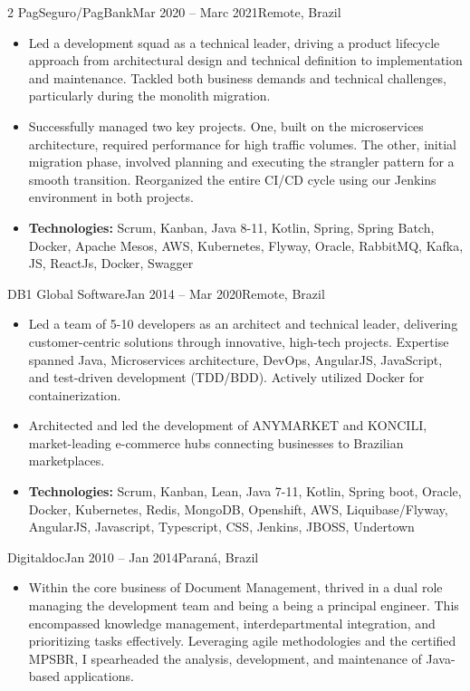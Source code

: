 \documentclass[10pt,a4paper,normalphoto]{altacv}
\begin{document}
\begin{paracol}{2}
 {PagSeguro/PagBank}{Mar 2020 -- Marc 2021}{Remote, Brazil}
\begin{itemize}
\item Led a development squad as a technical leader, driving a product lifecycle approach from architectural design and technical definition to implementation and maintenance. Tackled both business demands and technical challenges, particularly during the monolith migration.

\item Successfully managed two key projects. One, built on the microservices architecture, required performance for high traffic volumes. The other, initial migration phase, involved planning and executing the strangler pattern for a smooth transition. Reorganized the entire CI/CD cycle using our Jenkins environment in both projects.

\item[--]{\footnotesize \textbf{Technologies:} Scrum, Kanban, Java 8-11, Kotlin, Spring, Spring Batch, Docker, Apache Mesos, AWS, Kubernetes, Flyway, Oracle, RabbitMQ, Kafka, JS, ReactJs, Docker, Swagger}
\end{itemize}

\newpage
{} {DB1 Global Software}{Jan 2014 -- Mar 2020}{Remote, Brazil}
\begin{itemize}
\item Led a team of 5-10 developers as an architect and technical leader, delivering customer-centric solutions through innovative, high-tech projects. Expertise spanned Java, Microservices architecture, DevOps, AngularJS, JavaScript, and test-driven development (TDD/BDD). Actively utilized Docker for containerization.

\item Architected and led the development of ANYMARKET and KONCILI, market-leading e-commerce hubs connecting businesses to Brazilian marketplaces. 


\item[--]{\footnotesize \textbf{Technologies:} Scrum, Kanban, Lean, Java 7-11, Kotlin, Spring boot, Oracle, Docker, Kubernetes, Redis, MongoDB, Openshift, AWS, Liquibase/Flyway, AngularJS, Javascript, Typescript, CSS, Jenkins, JBOSS, Undertown}
\end{itemize}

\divider
{} {Digitaldoc}{Jan 2010 -- Jan 2014}{Paraná, Brazil}
\begin{itemize}
\item Within the core business of Document Management, thrived in a dual role managing the development team and being a being a principal engineer. This encompassed knowledge management, interdepartmental integration, and prioritizing tasks effectively. Leveraging agile methodologies and the certified MPSBR, I spearheaded the analysis, development, and maintenance of Java-based applications.


\end{itemize}
\end{paracol}
\end{document}
